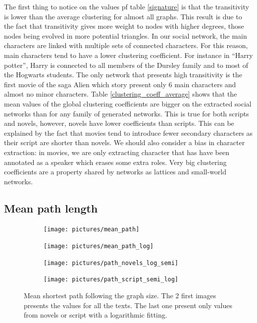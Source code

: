 \documentclass[a4paper, 12pt]{report}
\begin{document}
The first thing to notice on the values pf table \ref{signature} is that the transitivity is lower than the average clustering for almost all graphs. This result is due to the fact that transitivity gives more weight to nodes with higher degrees, those nodes being evolved in more potential triangles. In our social network, the main characters are linked with multiple sets of connected characters. For this reason, main characters tend to have a lower clustering coefficient. For instance in ``Harry potter'', Harry is connected to all members of the Dursley family and to most of the Hogwarts students. The only network that presents high transitivity is the first movie of the saga Alien which story present only 6 main characters and almost no minor characters. Table \ref{clustering_coeff_average} shows that the mean values of the global clustering coefficients are bigger on the extracted social networks than for any family of generated networks. This is true for both scripts and novels, however, novels have lower coefficients than scripts. This can be explained by the fact that movies tend to introduce fewer secondary characters as their script are shorter than novels. We should also consider a bias in character extraction: in movies, we are only extracting character that has have been annotated as a speaker which erases some extra roles. Very big clustering coefficients are a property shared by networks as lattices and small-world networks. \\


\subsection{Mean path length}
\begin{figure}
\begin{subfigure}{.49\textwidth}
\centering
\texttt{[image: pictures/mean\_path]}
\end{subfigure}
\hfill
\begin{subfigure}{.49\textwidth}
\centering
\texttt{[image: pictures/mean\_path\_log]}
\end{subfigure}
\hfill
\begin{subfigure}{.49\textwidth}
\centering
\texttt{[image: pictures/path\_novels\_log\_semi]}
\end{subfigure}
\hfill
\begin{subfigure}{.49\textwidth}
\centering
\texttt{[image: pictures/path\_script\_semi\_log]}
\end{subfigure}
\caption{Mean shortest path following the graph size. The 2 first images presents the values for all the texts. The last one present only values from novels or script with a logarithmic fitting. }
\label{mean_path}
\end{figure}
\end{document}

